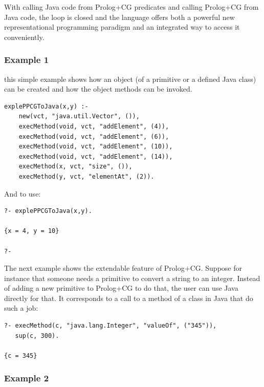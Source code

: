 \documentclass{book}
\begin{document}
With calling Java code from Prolog+CG predicates
and calling Prolog+CG from Java code, the loop is closed and
the language offers both a powerful new representational
programming paradigm and an integrated way to access it
conveniently.

\subsubsection{Example 1} 

this simple example shows how an object (of a primitive or a
defined Java class) can be created and how the object methods can be
invoked.

\begin{verbatim}
explePPCGToJava(x,y) :-
    new(vct, "java.util.Vector", ()),
    execMethod(void, vct, "addElement", (4)),
    execMethod(void, vct, "addElement", (6)),
    execMethod(void, vct, "addElement", (10)),
    execMethod(void, vct, "addElement", (14)),
    execMethod(x, vct, "size", ()),
    execMethod(y, vct, "elementAt", (2)).
\end{verbatim}


And to use:


\begin{verbatim}
?- explePPCGToJava(x,y).

{x = 4, y = 10}

?-
\end{verbatim}

The next example shows the extendable feature of Prolog+CG. Suppose
for instance that someone needs a primitive to convert a string to an
integer. Instead of adding a new primitive to Prolog+CG to do that,
the user can use Java directly for that. It corresponds to a call to a
method of a class in Java that do such a job:



\begin{verbatim}
?- execMethod(c, "java.lang.Integer", "valueOf", ("345")), 
   sup(c, 300).

{c = 345}
\end{verbatim}


\subsubsection{Example 2}
\end{document}
